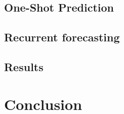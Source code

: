\documentclass[%
    corpo=12pt,
    twoside,
    oldstyle,
    autoretitolo,
    greek,
    evenboxes,
]{toptesi}
\begin{document}
\section{One-Shot Prediction}
\section{Recurrent forecasting}
\section{Results}


%



\chapter{Conclusion}





\end{document}
